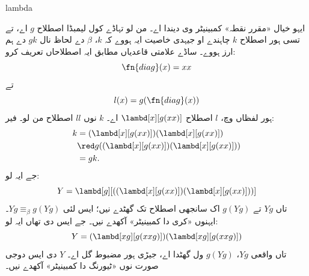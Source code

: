 \documentclass[../../../include/open-logic-section]{subfiles}
\begin{document}
\begin{tagblock}{lambda}
\begin{digress}
ایہو خیال
«مقرر نقطہ»
کمبینیٹر وی
دیندا اے۔
من لو تہاڈے
کول لیمبڈا اصطلاح
$g$ اے، تے
تسی ہور اصطلاح
$k$ چاہندے
او جیہدی
خاصیت ایہ
ہووے کہ $k$، $\beta$ دے لحاظ نال
$gk$ دے ہم ارز ہووے۔
ساڈے علامتی
قاعدیاں مطابق
ایہ اصطلاحاں
تعریف کرو:
\[
\fn{diag}(x) = xx
\]
تے
\[
l(x) = g(\fn{diag}(x))
\]
ہور لفظاں وچ،
$l$ اصطلاح
$\lambd[x][g(xx)]$
اے۔ $k$ نوں
$ll$ اصطلاح
من لو۔ فیر:
\begin{align*}
k & = (\lambd[x][g(xx)])(\lambd[x][g(xx)]) \\
& \red  g((\lambd[x][g(xx)])(\lambd[x][g(xx)])) \\
& = gk.
\end{align*}
جے ایہ لو:
\[
Y = \lambd[g][((\lambd[x][g(xx)])(\lambd[x][g(xx)]))]
\]
تاں $Yg$ تے
$g(Yg)$ اک
سانجھی اصطلاح
تک گھٹدے نیں؛
ایس لئی $Yg \equiv_\beta
g(Yg)$۔ ایہنوں
«کری دا کمبینیٹر»
آکھدے نیں۔
جے ایس دی
تھاں ایہ لو:
\[
Y = (\lambd[xg][g(xxg)])(\lambd[xg][g(xxg)])
\]
تاں واقعی $Yg$،
$g(Yg)$ ول
گھٹدا اے، جیڑی
ہور مضبوط گل
اے۔ $Y$ دی
ایس دوجی
صورت نوں
«ٹیورنگ دا
کمبینیٹر»
آکھدے نیں۔
\end{digress}
\end{tagblock}
\end{document}
